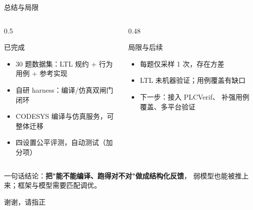 \documentclass[10pt,aspectratio=169]{beamer}
\begin{document}
\begin{frame}{总结与局限}
	\begin{columns}[T]
		\begin{column}{0.5\textwidth}
			\begin{block}{已完成}
				\begin{itemize}
					\item 30 题数据集：LTL 规约 + 行为用例 + 参考实现
					\item 自研 harness：编译/仿真双闸门闭环
					\item CODESYS 编译与仿真服务，可整体迁移
					\item 四设置公平评测，自动测试（加分项）
				\end{itemize}
			\end{block}
		\end{column}
		\begin{column}{0.48\textwidth}
			\begin{alertblock}{局限与后续}
				\begin{itemize}
					\item 每题仅采样 1 次，存在方差
					\item LTL 未机器验证；用例覆盖有缺口
					\item 下一步：接入 PLCVerif、
					      补强用例覆盖、多平台验证
				\end{itemize}
			\end{alertblock}
		\end{column}
	\end{columns}
	\vspace{0.6em}
	\begin{center}
		\begin{tcolorbox}[colback=blue!6,colframe=blue!45,arc=2pt,
				left=4pt,right=4pt,top=2pt,bottom=2pt]
			\centering\small
			一句话结论：\textbf{把"能不能编译、跑得对不对"做成结构化反馈}，
			弱模型也能被推上来；框架与模型需要匹配调优。
		\end{tcolorbox}
	\end{center}
	\vspace{0.3em}
	\centering
	{\Large 谢谢，请指正}
\end{frame}
\end{document}
